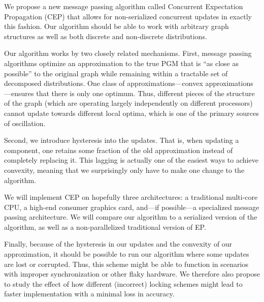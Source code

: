 \documentclass[12pt,leqno,twoside]{article}
\begin{document}
\begin{comment}
Consider a probability distribution over two binary variables $x_1$ and $x_2$
that have a distribution as in Figure 1. Suppose When updating sequentially,
the algorithm will converge quickly, with $x_1$ updating to the opposite of
$x_2$'s value. However, if the updates are performed in parallel, the 
system could potentially oscillate, never
\end{comment}

We propose a new message passing algorithm called Concurrent
Expectation Propagation (CEP) that allows for non-serialized
concurrent updates in exactly this fashion. Our algorithm should 
be able to work with arbitrary graph structures as well as both 
discrete and non-discrete distributions.

Our algorithm works by two closely related mechanisms. First, message
passing algorithms optimize an approximation to the true PGM that
is ``as close as possible'' to the original graph while remaining
within a tractable set of decomposed distributions. One class of
approximations---convex approximations---ensures that there is
only one optimum. Thus, different pieces of the structure of the
graph (which are operating largely independently on different
processors) cannot update towards different local optima, which is
one of the primary sources of oscillation.

Second, we introduce hysteresis into the updates. That is, when
updating a component, one retains some fraction of the old approximation
instead of completely replacing it. This lagging is actually one of 
the easiest ways to achieve convexity, meaning that
we surprisingly only have to make one change to the algorithm.

We will implement CEP on hopefully three architectures: a traditional multi-core
CPU, a high-end consumer graphics card, and---if possible---a
specialized message passing architecture. We will compare our
algorithm to a serialized version of the algorithm, as well as a
non-parallelized traditional version of EP.

Finally, because of the hysteresis in our updates and the convexity
of our approximation, it should be possible to run our algorithm
where some updates are lost or corrupted. Thus, this scheme might
be able to function in scenarios with improper synchronization or
other flaky hardware. We therefore also propose to study
the effect of how different (incorrect) locking schemes
might lead to faster implementation with a minimal loss in accuracy.
\end{document}
